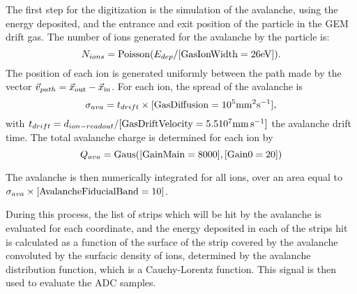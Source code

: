 The first step for the digitization is the simulation of the avalanche, using the energy deposited, and the entrance and exit position of the particle in the GEM drift gas.
The number of ions generated for the avalanche by the particle is:
%
\begin{equation}
  N_{ions} = {\rm Poisson}(E_{dep}/[{\rm GasIonWidth}=26 {\rm eV}]). %
\end{equation}
%
The position of each ion is generated uniformly between the path made by the vector $\vec{v}_{path} = \vec{x}_{\rm out}-\vec{x}_{\rm in}$. 
For each ion, the spread of the avalanche is
%
\begin{equation}
  \sigma_{ava} = t_{drift} \times [{\rm GasDiffusion} = 10^5 {\rm mm}^2{\rm s}^{-1}],
\end{equation}
%
with $t_{drift} = d_{ion-readout}/[{\rm GasDriftVelocity} = 5.5 10^7 {\rm mm}\,{\rm s}^{-1}]$ the avalanche drift time.
The total avalanche charge is determined for each ion by
%
\begin{equation}
  Q_{ava} = {\rm Gaus}([{\rm GainMain} = 8000], [{\rm Gain0} = 20] )
\end{equation}
%

The avalanche is then numerically integrated for all ions, over an area equal to $\sigma_{ava} \times[{\rm AvalancheFiducialBand} = 10]$.
%
%

During this process, the list of strips which will be hit by the avalanche is evaluated for each coordinate, and the energy deposited in each of the strips hit is calculated as a function of the surface of the strip covered by the avalanche convoluted by the surfacic density of ions, determined by the avalanche distribution function, which is a Cauchy-Lorentz function.
This signal is then used to evaluate the ADC samples.

